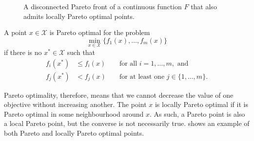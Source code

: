 \documentclass[main.tex]{subfiles}
\begin{document}
\begin{figure}[hbtp]
  \centering
  \caption[A disconnected Pareto front]{A disconnected Pareto front of a continuous function $F$
    that also admits locally Pareto optimal points.
  }\label{fig:pareto_local_disconnected}
\end{figure}

\begin{mydef}
  A point $x\in\mathcal{X}$ is Pareto optimal for the problem
  \begin{equation}
    \min_{x\in\mathcal{X}}\{f_1(x),\dots,f_m(x)\}
  \end{equation}
  if there is no
  $x^*\in\mathcal{X}$ such that
  \begin{align}
    f_i(x^*)&\leq f_i(x) &&\text{ for all } i = 1,\dots,m, \text{ and}\\
    f_j(x^*)&<f_j(x) &&\text{ for at least one } j \in \{1,\dots,m\}.
  \end{align}
\end{mydef}
Pareto optimality, therefore, means that we cannot decrease the value of
one objective without increasing another.
The point $x$ is locally Pareto optimal if it is Pareto optimal in
some neighbourhood around $x$. As such, a Pareto point is also a local
Pareto point, but the converse is not necessarily
true. 
shows an example of both Pareto and locally Pareto optimal points.
\end{document}
